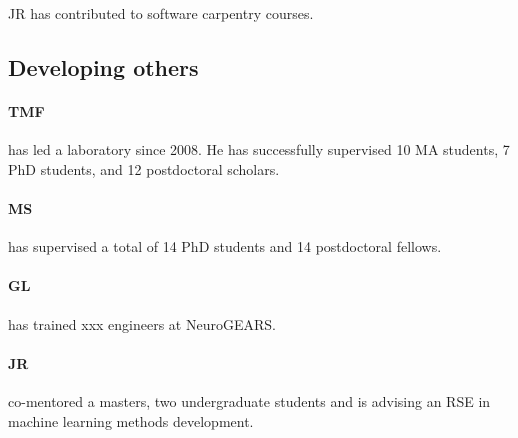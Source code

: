 JR has contributed to software carpentry courses.


\subsection*{Developing others}

\paragraph{TMF} has led a laboratory since 2008. He has
successfully supervised 10 MA students, 7 PhD students, and 12 postdoctoral
scholars.

\paragraph{MS} has supervised a total of 14 PhD students and
14 postdoctoral fellows.

\paragraph{GL} has trained xxx engineers at NeuroGEARS.

\paragraph{JR} co-mentored a masters, two undergraduate
students and is advising an RSE in machine learning methods development.
